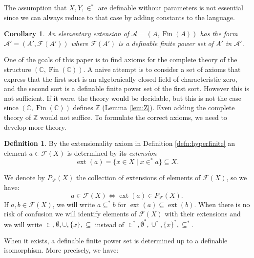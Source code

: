 \documentclass{amsart}
\newcommand{\C}{\mathbb C}
\newcommand{\Z}{\mathbb Z}
\newcommand{\ca}{\mathcal}
\newcommand{\Fin}{\operatorname{Fin}}
\theoremstyle{plain}
\newtheorem{cor}[thm]{Corollary}
\theoremstyle{definition}
\newtheorem{defn}[thm]{Definition}
\newcommand{\ins}{\in^*}
\newcommand{\F}{\mathcal{F}}
\newcommand{\pF}{P_{\ca F}}
\newcommand{\ext}[1]{\operatorname{ext}(#1)}
\begin{document}
The assumption that $X,Y,\ins$ are definable without parameters is not essential since we can always reduce to that case by adding constants to the language.
\begin{cor}
An elementary extension of $\ca A = (A,\Fin(A))$ has the form $\ca A' = (A', \F(A'))$ where $\F(A')$ is a definable finite power set of $A'$ in $\ca A'$. 
\end{cor}

One of the goals of this paper is to find axioms for the complete theory of the structure $(\C, \Fin(\C))$. A naive attempt is to consider a set of axioms that express that the first sort is an algebraically closed field of characteristic zero, and the second sort is a definable finite power set of the first sort. However this is not sufficient. If it were, the theory would be decidable, but this is not the case since $(\C, \Fin(\C))$ defines $\Z$ (Lemma \ref{lem:Z}). Even adding the complete theory of $\Z$ would not suffice. 
To formulate the correct axioms, we need to develop more theory. 

\begin{defn}\label{defn:PF}
By the extensionality axiom in Definition \ref{defn:hyperfinite} an element $a\in \F(X)$ is determined by its {\em extension} 
%
$$\ext a = \{x\in X \mid x \ins a\} \subseteq X.$$
%

We denote by $\pF(X)$ the collection of extensions of elements of $\F(X)$, so we have: 
$$a \in \F(X) \iff \ext a \in \pF (X).$$ 
If $a,b\in \F(X)$, we will write $a\subseteq^* b$ for $\ext a \subseteq \ext b$.
When there is no risk of confusion we will identify elements of $\F(X)$ with their extensions and we will write $\in, \emptyset, \cup, \{x\}, \subseteq$ instead of $\ins, \emptyset^*, \cup^*, \{x\}^*, \subseteq^*$.  
\end{defn}

When it exists, a definable finite power set is determined up to a definable isomorphism. More precisely, we have: 
\end{document}
